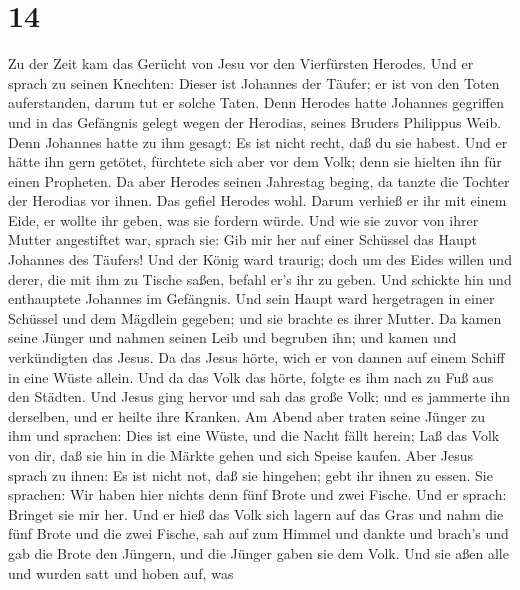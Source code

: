\hypertarget{section-13}{%
\section{14}\label{section-13}}

 Zu der Zeit kam das Gerücht von Jesu vor den Vierfürsten
Herodes.  Und er sprach zu seinen Knechten: Dieser ist
Johannes der Täufer; er ist von den Toten auferstanden, darum tut er
solche Taten.  Denn Herodes hatte Johannes gegriffen und in
das Gefängnis gelegt wegen der Herodias, seines Bruders Philippus Weib.
 Denn Johannes hatte zu ihm gesagt: Es ist nicht recht, daß
du sie habest.  Und er hätte ihn gern getötet, fürchtete
sich aber vor dem Volk; denn sie hielten ihn für einen Propheten.
 Da aber Herodes seinen Jahrestag beging, da tanzte die
Tochter der Herodias vor ihnen. Das gefiel Herodes wohl. 
Darum verhieß er ihr mit einem Eide, er wollte ihr geben, was sie
fordern würde.  Und wie sie zuvor von ihrer Mutter
angestiftet war, sprach sie: Gib mir her auf einer Schüssel das Haupt
Johannes des Täufers!  Und der König ward traurig; doch um
des Eides willen und derer, die mit ihm zu Tische saßen, befahl er's ihr
zu geben.  Und schickte hin und enthauptete Johannes im
Gefängnis.  Und sein Haupt ward hergetragen in einer
Schüssel und dem Mägdlein gegeben; und sie brachte es ihrer Mutter.
 Da kamen seine Jünger und nahmen seinen Leib und begruben
ihn; und kamen und verkündigten das Jesus.  Da das Jesus
hörte, wich er von dannen auf einem Schiff in eine Wüste allein. Und da
das Volk das hörte, folgte es ihm nach zu Fuß aus den Städten.
 Und Jesus ging hervor und sah das große Volk; und es
jammerte ihn derselben, und er heilte ihre Kranken.  Am
Abend aber traten seine Jünger zu ihm und sprachen: Dies ist eine Wüste,
und die Nacht fällt herein; Laß das Volk von dir, daß sie hin in die
Märkte gehen und sich Speise kaufen.  Aber Jesus sprach zu
ihnen: Es ist nicht not, daß sie hingehen; gebt ihr ihnen zu essen.
 Sie sprachen: Wir haben hier nichts denn fünf Brote und
zwei Fische.  Und er sprach: Bringet sie mir her.
 Und er hieß das Volk sich lagern auf das Gras und nahm die
fünf Brote und die zwei Fische, sah auf zum Himmel und dankte und
brach's und gab die Brote den Jüngern, und die Jünger gaben sie dem
Volk.  Und sie aßen alle und wurden satt und hoben auf, was
